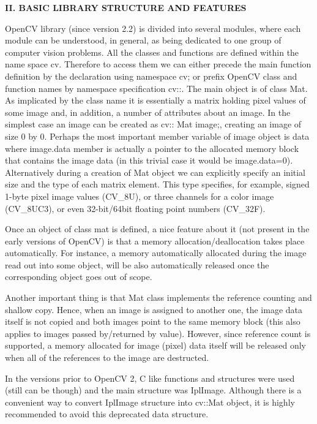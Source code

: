 \documentclass{bjtu-bachelor-thesis}
\begin{document}
\begin{appendices}
\textbf{II. BASIC LIBRARY STRUCTURE AND FEATURES} \par
OpenCV library (since version 2.2) is divided into several modules, where each module can be understood, in general, as being dedicated to one group of computer vision problems. All the classes and functions are defined within the name space cv. Therefore to access them we can either precede the main function definition by the declaration using namespace cv; or prefix OpenCV class and function names by namespace specification cv::. The main object is of class Mat. As implicated by the class name it is essentially a matrix holding pixel values of some image and, in addition, a number of attributes about an image. In the simplest case an image can be created as cv:: Mat image;, creating an image of size 0 by 0. Perhaps the most important member variable of image object is data where image.data member is actually a pointer to the allocated memory block that contains the image data (in this trivial case it would be image.data=0). Alternatively during a creation of Mat object we can explicitly specify an initial size and the type of each matrix element. This type specifies, for example, signed 1-byte pixel image values (CV\_8U), or three channels for a color image (CV\_8UC3), or even 32-bit/64bit floating point numbers (CV\_32F).\par
Once an object of class mat is defined, a nice feature about it (not present in the early versions of OpenCV) is that a memory allocation/deallocation takes place automatically. For instance, a memory automatically allocated during the image read out into some object, will be also automatically released once the corresponding object goes out of scope.\par
Another important thing is that Mat class implements the reference counting and shallow copy. Hence, when an image is assigned to another one, the image data itself is not copied and both images point to the same memory block (this also applies to images passed by/returned by value). However, since reference count is supported, a memory allocated for image (pixel) data itself will be released only when all of the references to the image are destructed.\par
In the versions prior to OpenCV 2, C like functions and structures were used (still can be though) and the main structure was IplImage. Although there is a convenient way to convert IplImage structure into cv::Mat object, it is highly recommended to avoid this deprecated data structure.\par


\end{appendices}
\end{document}
